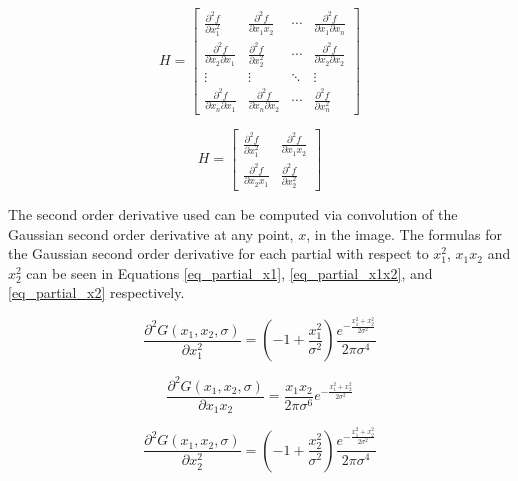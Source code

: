 \documentclass{article}
\begin{document}
\begin{equation}
H = \begin{bmatrix}
\frac{\partial^2 f}{\partial x_1^2} & \frac{\partial^2 f}{\partial x_1 x_2} & \cdots & \frac{\partial^2 f}{\partial x_1 \partial x_n} \\
\frac{\partial^2 f}{\partial x_2 \partial x_1} & \frac{\partial^2 f}{\partial x_2^2} & \cdots & \frac{\partial^2 f}{\partial x_2 \partial x_2} \\
\vdots & \vdots & \ddots & \vdots \\
\frac{\partial^2 f}{\partial x_n \partial x_1} & \frac{\partial^2 f}{\partial x_n \partial x_2} & \cdots & \frac{\partial^2 f}{\partial x_n^2}
\end{bmatrix}
\label{eq_hessian_general}
\end{equation}

\begin{equation}
H = \begin{bmatrix}
\frac{\partial^2 f}{\partial x_1^2} & \frac{\partial^2 f}{\partial x_1 x_2} \\
\frac{\partial^2 f}{\partial x_2 x_1} & \frac{\partial^2 f}{\partial x_2^2}
\end{bmatrix}
\label{eq_hessian_r2}
\end{equation}

The second order derivative used can be computed via convolution of the Gaussian second order derivative at any point, $x$, in the image. The formulas for the Gaussian second order derivative for each partial with respect to $x_1^2$, $x_1 x_2$ and $x_2^2$ can be seen in Equations \ref{eq_partial_x1}, \ref{eq_partial_x1x2}, and \ref{eq_partial_x2} respectively.

\begin{equation}
\frac{\partial^2 G(x_1,x_2,\sigma)}{\partial x_1^2} = (-1 + \frac{x_1^2}{\sigma^2})\frac{e^{-\frac{x_1^2+x_2^2}{2\sigma^2}}}{2\pi \sigma^4}
\label{eq_partial_x1}
\end{equation}

\begin{equation}
\frac{\partial^2 G(x_1,x_2,\sigma)}{\partial x_1 x_2} = \frac{x_1 x_2}{2 \pi \sigma^6}e^{-\frac{x_1^2 + x_2^2}{2 \sigma^2}}
\label{eq_partial_x1x2}
\end{equation}

\begin{equation}
\frac{\partial^2 G(x_1,x_2,\sigma)}{\partial x_2^2} = (-1 + \frac{x_2^2}{\sigma^2})\frac{e^{-\frac{x_1^2+x_2^2}{2\sigma^2}}}{2\pi \sigma^4}
\label{eq_partial_x2}
\end{equation}
\end{document}
